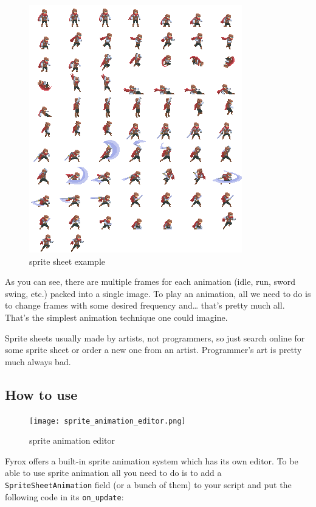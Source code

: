 \documentclass[
]{book}
\theoremstyle{definition}
\theoremstyle{definition}
\theoremstyle{definition}
\theoremstyle{definition}
\theoremstyle{remark}
\begin{document}
\begin{figure}
\centering
\includegraphics{images/animation/sprite_sheet_example.png}
\caption{sprite sheet example}
\end{figure}

As you can see, there are multiple frames for each animation (idle, run, sword swing, etc.) packed into a single image. To play an animation, all we need to do is to change frames with some desired frequency and\ldots{} that's pretty much all. That's the simplest animation technique one could imagine.

Sprite sheets usually made by artists, not programmers, so just search online for some sprite sheet or order a new one from an artist. Programmer's art is pretty much always bad.

\subsection{How to use}\label{how-to-use-2}

\begin{figure}
\centering
\texttt{[image: sprite\_animation\_editor.png]}
\caption{sprite animation editor}
\end{figure}

Fyrox offers a built-in sprite animation system which has its own editor. To be able to use sprite animation all you need to do is to add a \texttt{SpriteSheetAnimation} field (or a bunch of them) to your script and put the following code in its \texttt{on\_update}:
\end{document}
